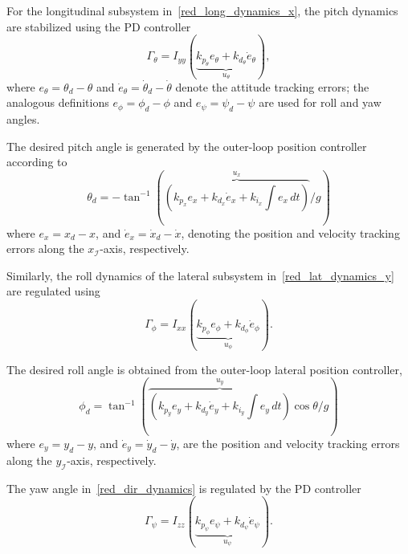 \documentclass[conference]{IEEEtran}
\begin{document}
For the longitudinal subsystem in~\eqref{red_long_dynamics_x}, the pitch dynamics are stabilized using the PD controller
\begin{equation}
\Gamma_\theta
=
I_{yy}
(\underbrace{
k_{p_\theta}e_\theta
+k_{d_\theta}\dot{e}_\theta}_{u_\theta}
),
\end{equation}
where $e_\theta=\theta_d-\theta$ and $\dot e_\theta=\dot{\theta}_d-\dot{\theta}$ denote the attitude tracking errors; the analogous definitions $e_\phi=\phi_d-\phi$ and $e_\psi=\psi_d-\psi$ are used for roll and yaw angles.

The desired pitch angle is generated by the outer-loop position controller according to
%
\begin{equation}\label{eq:thetad}
\theta_d
=
-\tan^{-1}\left({\overbrace{ \left(k_{p_x}e_x + k_{d_x}\dot e_x + k_{i_x}\int e_x\,dt\right)}^{u_x}}/{g}\right)
\end{equation}
%
%
where $e_x=x_d-x$, and $\dot e_x=\dot x_d-\dot x$, denoting the position and velocity tracking errors along the $x_\mathcal{I}$-axis, respectively.

Similarly, the roll dynamics of the lateral subsystem in~\eqref{red_lat_dynamics_y} are regulated using
\begin{equation}
\Gamma_\phi
=
I_{xx}
(\underbrace{
k_{p_\phi}e_\phi
+k_{d_\phi}\dot{e}_\phi
}_{u_\phi}).
\end{equation}

The desired roll angle is obtained from the outer-loop lateral position controller,
%
\begin{equation}\label{eq:phid}
\phi_d
=
\tan^{-1}\left({\overbrace{\left(k_{p_y}e_y+ k_{d_y}\dot e_y+ k_{i_y}\int e_y\,dt\right)}^{u_y}\cos\theta}/{g}\right)
\end{equation}
%
%
where $e_y=y_d-y$, and $\dot e_y=\dot y_d-\dot y$, are the position and velocity tracking errors along the $y_\mathcal{I}$-axis, respectively.

The yaw angle in~\eqref{red_dir_dynamics} is regulated by the PD controller
%
\begin{equation}
\Gamma_\psi
=
I_{zz}
(\underbrace{
k_{p_\psi}e_\psi
+k_{d_\psi}\dot{e}_\psi}_{u_\psi}
).
\end{equation}
\end{document}
